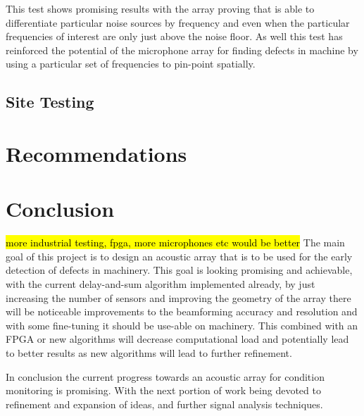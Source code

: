 \documentclass{UoNMCHA}
\numberwithin{equation}{section}
\begin{document}
    This test shows promising results with the array proving that is able to differentiate particular noise sources by frequency and even when the particular frequencies of interest are only just above the noise floor. As well this test has reinforced the potential of the microphone array for finding defects in machine by using a particular set of frequencies to pin-point spatially.

\subsection{Site Testing} \label{sec:Site Testing}
\newpage
\section{Recommendations} \label{sec:Recommendations}

\newpage
\section{Conclusion} \label{sec:Conclusion}
    \hl{more industrial testing, fpga, more microphones etc would be better}
    The main goal of this project is to design an acoustic array that is to be used for the early detection of defects in machinery. This goal is looking promising and achievable, with the current delay-and-sum algorithm implemented already, by just increasing the number of sensors and improving the geometry of the array there will be noticeable improvements to the beamforming accuracy and resolution and with some fine-tuning it should be use-able on machinery. This combined with an FPGA or new algorithms will decrease computational load and potentially lead to better results as new algorithms will lead to further refinement.  
    
    In conclusion the current progress towards an acoustic array for condition monitoring is promising. With the next portion of work being devoted to refinement and expansion of ideas, and further signal analysis techniques.
\newpage


\newpage
\appendix
\captionsetup[figure]{list=no}
\end{document}
